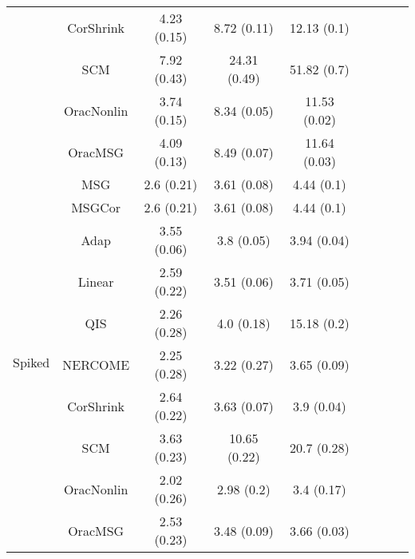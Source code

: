 \documentclass[useAMS,referee,usenatbib]{biom}
\begin{document}
\begin{table}[H]
{\begin{tabular}{ccccccccc}
 & CorShrink      & 4.23 (0.15) & 8.72 (0.11)  & 12.13 (0.1)  \\
 & SCM            & 7.92 (0.43) & 24.31 (0.49) & 51.82 (0.7)  \\
 & OracNonlin & 3.74 (0.15) & 8.34 (0.05)  & 11.53 (0.02) \\
 & OracMSG  & 4.09 (0.13) & 8.49 (0.07)  & 11.64 (0.03) \\  \midrule
\multirow{10}{*}{Spiked}  
 & MSG & 2.6 (0.21)  & 3.61 (0.08)  & 4.44 (0.1)  \\
 & MSGCor   & 2.6 (0.21)  & 3.61 (0.08)  & 4.44 (0.1)  \\
 & Adap     & 3.55 (0.06) & 3.8 (0.05)   & 3.94 (0.04) \\
 & Linear         & 2.59 (0.22) & 3.51 (0.06)  & 3.71 (0.05) \\
 & QIS            & 2.26 (0.28) & 4.0 (0.18)   & 15.18 (0.2) \\
 & NERCOME        & 2.25 (0.28) & 3.22 (0.27)  & 3.65 (0.09) \\
 & CorShrink      & 2.64 (0.22) & 3.63 (0.07)  & 3.9 (0.04)  \\
 & SCM            & 3.63 (0.23) & 10.65 (0.22) & 20.7 (0.28) \\
 & OracNonlin & 2.02 (0.26) & 2.98 (0.2)   & 3.4 (0.17)  \\
 & OracMSG  & 2.53 (0.23) & 3.48 (0.09)  & 3.66 (0.03) \\ \bottomrule
\end{tabular}%
}
\end{table}
\end{document}
